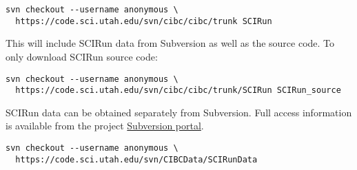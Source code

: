 \documentclass[fleqn,12pt,openany]{book}
\begin{document}
\begin{verbatim}
svn checkout --username anonymous \
  https://code.sci.utah.edu/svn/cibc/cibc/trunk SCIRun
\end{verbatim}

\noindent This will include SCIRun data from Subversion as well as the source code.
To only download SCIRun source code:

\begin{verbatim}
svn checkout --username anonymous \
  https://code.sci.utah.edu/svn/cibc/cibc/trunk/SCIRun SCIRun_source
\end{verbatim}

SCIRun data can be obtained separately from Subversion.
Full access information is available from the project
\href{https://code.sci.utah.edu/gf/project/CIBCData/scmsvn/?action=AccessInfo}{Subversion portal}.

\begin{verbatim}
svn checkout --username anonymous \
  https://code.sci.utah.edu/svn/CIBCData/SCIRunData
\end{verbatim}
\end{document}

